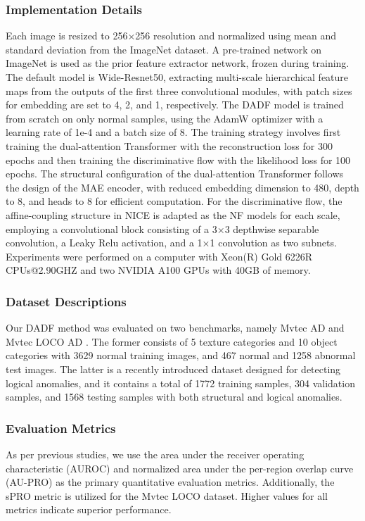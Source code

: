 \documentclass[journal]{IEEEtran}
\begin{document}
\subsubsection{Implementation Details}
Each image is resized to 256×256 resolution and normalized using mean and standard deviation from the ImageNet dataset. A pre-trained network on ImageNet is used as the prior feature extractor network, frozen during training. The default model is Wide-Resnet50, extracting multi-scale hierarchical feature maps from the outputs of the first three convolutional modules, with patch sizes for embedding are set to 4, 2, and 1, respectively. The DADF model is trained from scratch on only normal samples, using the AdamW optimizer with a learning rate of 1e-4 and a batch size of 8. The training strategy involves first training the dual-attention Transformer with the reconstruction loss for 300 epochs and then training the discriminative flow with the likelihood loss for 100 epochs. The structural configuration of the dual-attention Transformer follows the design of the MAE\cite{r18} encoder, with reduced embedding dimension to 480, depth to 8, and heads to 8 for efficient computation. For the discriminative flow, the affine-coupling structure in NICE is adapted as the NF models for each scale, employing a convolutional block consisting of a 3×3 depthwise separable convolution, a Leaky Relu activation, and a 1×1 convolution as two subnets. Experiments were performed on a computer with Xeon(R) Gold 6226R CPUs@2.90GHZ and two NVIDIA A100 GPUs with 40GB of memory.


\subsubsection{Dataset Descriptions}
Our DADF method was evaluated on two benchmarks, namely Mvtec AD and Mvtec LOCO AD \cite{r3,r19}. The former consists of 5 texture categories and 10 object categories with 3629 normal training images, and 467 normal and 1258 abnormal test images. The latter is a recently introduced dataset designed for detecting logical anomalies, and it contains a total of 1772 training samples, 304 validation samples, and 1568 testing samples with both structural and logical anomalies.


\subsubsection{Evaluation Metrics}

As per previous studies, we use the area under the receiver operating characteristic (AUROC) and normalized area under the per-region overlap curve (AU-PRO)\cite{r6} as the primary quantitative evaluation metrics. Additionally, the sPRO\cite{r23} metric is utilized for the Mvtec LOCO dataset. Higher values for all metrics indicate superior performance.
\end{document}
